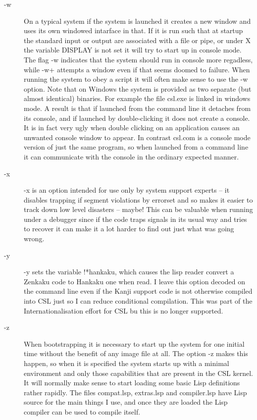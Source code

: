 \documentclass[a4paper,11pt]{article}
\begin{document}
\begin{description}
\item [{\ttfamily -w}] 
On a typical system if the system is launched it creates a new window and uses
its own windowed intarface in that. If it is run such that at startup the
standard input or output are associated with a file or pipe, or under X the
variable {\ttfamily DISPLAY} is not set it will try to start up in console
mode. The flag {\ttfamily -w} indicates that the system should run in console
more regadless, while {\ttfamily -w+} attempts a window even if that seems
doomed to failure. When running the system to obey a script it will often make
sense to use the {\ttfamily -w} option. Note that on Windows the system is
provided as two separate (but almost identical) binaries. For example the
file {\ttfamily csl.exe} is linked in windows mode. A result is that if
launched from the command line it detaches from its console, and if launched
by double-clicking it does not create a console. It is in fact very ugly when
double clicking on an application causes an unwanted console window to appear.
In contrast {\ttfamily csl.com} is a console mode version of just the same
program, so when launched from a command line it can communicate with the
console in the ordinary expected manner.

\item [{\ttfamily -x}] 
{\ttfamily -x} is an option intended for use only by system
support experts -- it disables trapping if segment violations by
errorset and so makes it easier to track down low level disasters --
maybe!  This can be valuable when running under a debugger since if the
code traps signals in its usual way and tries to recover it can make it a lot
harder to find out just what was going wrong.

\item [{\ttfamily -y}] 
{\ttfamily -y } sets the variable {\ttfamily !*hankaku}, which causes the
lisp reader convert a Zenkaku code to Hankaku one when read. I leave this
option decoded on the command line even if the Kanji support code is not
otherwise compiled into CSL just so I can reduce conditional compilation.
This was part of the Internationalisation effort for CSL bu this is no longer
supported.

\item [{\ttfamily -z}] 
When bootstrapping it is necessary to start up the system for one initial time
without the benefit of any image file at all. The option {\ttfamily -z} makes
this happen, so when it is specified the system starts up with a minimal
environment and only those capabilities that are present in the CSL
kernel. It will normally make sense to start loading some basic Lisp
definitions rather rapidly. The files {\ttfamily compat.lsp},
{\ttfamily extras.lsp} and {\ttfamily compiler.lsp} have Lisp source for the
main things I use, and once they are loaded the Lisp compiler can be used
to compile itself.

\end{description} %
\end{document}
